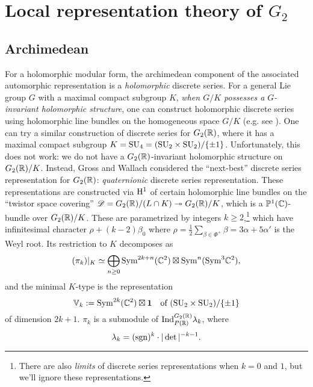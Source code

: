 \section{Local representation theory of $G_2$}
\label{sec:g2localrep}

\subsection{Archimedean}
\label{subsec:arch}

For a holomorphic modular form, the archimedean component of the associated automorphic representation is a \emph{holomorphic} discrete series.
For a general Lie group $G$ with a maximal compact subgroup $K$, \emph{when $G/K$ possesses a $G$-invariant holomorphic structure}, one can construct holomorphic discrete series using holomorphic line bundles on the homogeneous space $G/K$ (e.g. see \cite{schmid19762}).
One can try a similar construction of discrete series for $G_2(\mathbb{R})$, where it has a maximal compact subgroup $K = \mathrm{SU}_4 = (\mathrm{SU}_2 \times \mathrm{SU}_2) / \{\pm 1\}$.
Unfortunately, this does not work: we do not have a $G_2(\mathbb{R})$-invariant holomorphic structure on $G_2(\mathbb{R}) / K$.
Instead, Gross and Wallach \cite{gross1996quaternionic} considered the ``next-best'' discrete series representation for $G_2(\mathbb{R})$:
\emph{quaternionic} discrete series representation.
These representations are constructed via $\mathrm{H}^1$ of certain holomorphic line bundles on the ``twistor space covering'' $\mathscr{D} = G_2(\mathbb{R}) / (L \cap K) \twoheadrightarrow G_2(\mathbb{R}) / K$, which is a $\mathbb{P}^1(\mathbb{C})$-bundle over $G_2(\mathbb{R}) / K$.
These are parametrized by integers $k \ge 2$,\footnote{There are also \emph{limits} of discrete series representations when $k = 0$ and $1$, but we'll ignore these representations.} which have infinitesimal character $\rho + (k - 2) \beta_0$ where $\rho = \frac{1}{2}\sum_{\beta \in \Phi^+} \beta = 3 \alpha + 5 \alpha'$ is the Weyl root.
Its restriction to $K$ decomposes as
$$
(\pi_k)|_K \simeq \bigoplus_{n \ge 0} \mathrm{Sym}^{2k + n}(\mathbb{C}^2) \boxtimes \mathrm{Sym}^n(\mathrm{Sym}^3 \mathbb{C}^2),
$$
and the minimal $K$-type is the representation
$$
    \mathbb{V}_{k} := \mathrm{Sym}^{2k}(\mathbb{C}^2) \boxtimes \mathbf{1} \quad \text{of }(\mathrm{SU}_2 \times \mathrm{SU}_2) / \{\pm 1\}
$$
of dimension $2k + 1$.
$\pi_k$ is a submodule of $\mathrm{Ind}_{P(\mathbb{R})}^{G_2(\mathbb{R})} \lambda_k$, where
$$
    \lambda_k = (\mathrm{sgn})^k \cdot |\det|^{-k-1}.
$$

